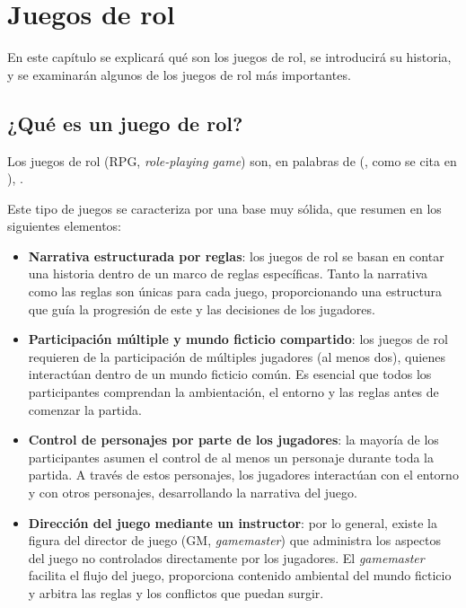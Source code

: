 \chapter{Juegos de rol}
\label{cap:juegosrol}



\begin{resumen}
En este capítulo se explicará qué son los juegos de rol, se introducirá su historia, y se examinarán algunos de los juegos de rol más importantes.
\end{resumen}

\section{¿Qué es un juego de rol?}
Los juegos de rol (RPG, \textit{role-playing game}) son, en palabras de \citeauthor{LortzRPG} (\citeyear{LortzRPG}, como se cita en \cite{FineRPG}), . 

\medskip

Este tipo de juegos se caracteriza por una base muy sólida, que \cite{TychsenRPG} resumen en los siguientes elementos:

\begin{itemize}
	\item \textbf{Narrativa estructurada por reglas}: los juegos de rol se basan en contar una historia dentro de un marco de reglas específicas. Tanto la narrativa como las reglas son únicas para cada juego, proporcionando una estructura que guía la progresión de este y las decisiones de los jugadores.
	\item \textbf{Participación múltiple y mundo ficticio compartido}: los juegos de rol requieren de la participación de múltiples jugadores (al menos dos), quienes interactúan dentro de un mundo ficticio común. Es esencial que todos los participantes comprendan la ambientación, el entorno y las reglas antes de comenzar la partida.
	\item \textbf{Control de personajes por parte de los jugadores}: la mayoría de los participantes asumen el control de al menos un personaje durante toda la partida. A través de estos personajes, los jugadores interactúan con el entorno y con otros personajes, desarrollando la narrativa del juego.
	\item \textbf{Dirección del juego mediante un instructor}: por lo general, existe la figura del director de juego (GM, \textit{gamemaster}) que administra los aspectos del juego no controlados directamente por los jugadores. El \textit{gamemaster} facilita el flujo del juego, proporciona contenido ambiental del mundo ficticio y arbitra las reglas y los conflictos que puedan surgir.
\end{itemize}

